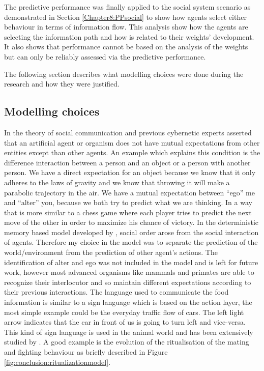 The predictive performance was finally applied to the social system scenario
as demonstrated in Section \ref{Chapter8:PPsocial} to show how agents
select either behaviour in terms of information flow.
This analysis show how the agents are selecting the information path and 
how is related to their weights' development.
It also shows that performance cannot be based on the analysis of the weights
but can only be reliably assessed via the predictive performance.

The following section describes what modelling choices were done during the
research and how they were justified.

\subsection{Modelling choices}
In the theory of social communication \citet{Luhmann95} and previous cybernetic
 experts asserted that an artificial agent or organism does not have mutual expectations
 from other entities except than other agents. An example which explains this condition is
 the difference interaction between a person and an object or a person with another person.
We have a direct expectation for an object because we know that it only adheres to the
 laws of gravity and we know that throwing it will make a parabolic trajectory in the air.
We have a mutual expectation between ``ego'' me and ``alter'' you, because we both try
 to predict what we are thinking. In a way that is more similar to a chess game where each
 player tries to predict the next move of the other in order to maximize his chance of victory.
In the deterministic memory based model developed by \citet{SocialOrderScalability}, social
 order arose from the social interaction of agents.
Therefore my choice in the model was to separate the prediction of the world/environment from the
 prediction of other agent's actions.
The identification of alter and ego was not included in the model and is left for future work,
however most advanced organisms like mammals and primates are able to recognize their
interlocutor and so maintain different expectations according to their previous interactions.
The language used to communicate the food information is similar to a sign language which is based
on the action layer, the most simple example could be the everyday traffic flow of cars.
The left light arrow indicates that the car in front of us is going to turn left and vice-versa.
This kind of sign language is used in the animal world and has been extensively studied by 
\citet{AnimalSignals}.
A good example is the evolution of the ritualisation of the mating and fighting behaviour
as briefly described in Figure \ref{fig:conclusion:ritualizationmodel}.

